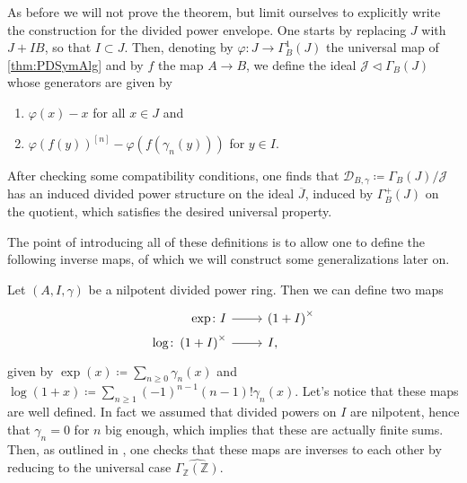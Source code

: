 \begin{rem}[]\label{rem:PDEnvelope}
	As before we will not prove the theorem, but limit
	ourselves to explicitly write the construction for the divided
	power envelope.
	One starts by replacing $J$ with $J + IB$, so that $I \subset J$.
	Then, denoting by $\varphi\colon J \to \Gamma^1_B(J)$ the universal
	map of \cref{thm:PDSymAlg} and by $f$ the map $A \to B$, 
	we define the ideal $\mathcal{J} \triangleleft \Gamma_B(J)$
	whose generators are given by
\begin{enumerate}
	\item $\varphi(x) - x$ for all $x \in J$ and
	\item $\varphi(f(y))^{[n]} - \varphi(f(\gamma_n(y)))$ for $y \in I$.
\end{enumerate}
	After checking some compatibility conditions, one finds that
	$\mathcal{D}_{ B, \gamma } \coloneqq \Gamma_B(J)/\mathcal{J}$ has an induced divided power
	structure on the ideal \(\overline{J}\), induced by \(\Gamma^+_B(J)\) on the quotient,
	which satisfies the desired universal property.
\end{rem}


\noindent
The point of introducing all of these definitions is to allow one to define the following
inverse maps, of which we will construct some generalizations later on.
\begin{defn}[]\label{defn:PDExponential}
	Let $\left(A, I, \gamma\right)$ be a nilpotent divided power ring.
	Then we can define two maps
	\begin{equation*}
	\begin{tikzcd}[row sep = 0ex
		,/tikz/column 1/.append style={anchor=base east}
		,/tikz/column 2/.append style={anchor=base west}]
		\exp\colon I \arrow[r, "", rightarrow] &
		\left( 1 + I \right)^{\times}\\
		\log\colon \left( 1 + I \right)^{\times} \arrow[r, "", rightarrow] &
		I
	,\end{tikzcd}
	\end{equation*} 
	given by 
	$\exp (x) \coloneqq \sum_{n\geq 0} \gamma_n(x)$
	and $\log (1+x) \coloneqq \sum_{n\geq 1} 
	(-1)^{n-1} \left( n-1 \right)! \gamma_n(x)$.
	Let's notice that these maps are well defined.
	In fact we assumed that divided powers on $I$ are nilpotent,
	hence that $\gamma_n = 0$ for $n$ big enough, which implies that
	these are actually finite sums.
	Then, as outlined in \cite[Chapter III, \S1.6]{Messing},
	one checks that these maps are inverses to each other
	by reducing to the universal case $\widehat{\Gamma_{\mathbb{Z}}(\mathbb{Z})}$.
\end{defn}



